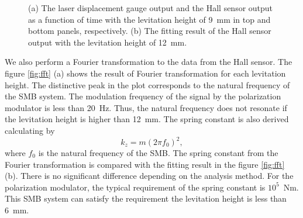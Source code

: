 \documentclass[a4paper,11pt]{jpconf}
\begin{document}
\begin{figure}[htbp]
  \centering
  \begin{minipage}{0.45\hsize}
  \end{minipage}
  \begin{minipage}{0.1\hsize}
  \end{minipage}
  \begin{minipage}{0.45\hsize}
    \centering
  \end{minipage}
  \caption{(a) The laser displacement gauge output and the Hall sensor output as a function of time with the levitation height of 9~mm in top and bottom panels, respectively.
    (b) The fitting result of the Hall sensor output with the levitation height of 12~mm.}
  \label{fig:vibration}
\end{figure}

We also perform a Fourier transformation to the data from the Hall sensor.
The figure \ref{fig:fft} (a) shows the result of Fourier transformation for each levitation height.
The distinctive peak in the plot corresponds to the natural frequency of the SMB system.
The modulation frequency of the signal by the polarization modulator is less than 20~Hz.
Thus, the natural frequency does not resonate if the levitation height is higher than 12~mm.
The spring constant is also derived calculating by
\begin{equation}
  k_{z} = m (2 \pi f_{0})^{2},
\end{equation}
where $f_{0}$ is the natural frequency of the SMB.
The spring constant from the Fourier transformation is compared with the fitting result in the figure \ref{fig:fft} (b).
There is no significant difference depending on the analysis method.
For the polarization modulator, the typical requirement of the spring constant is $10^{5}$~Nm.
This SMB system can satisfy the requirement the levitation height is less than 6~mm.
\end{document}
